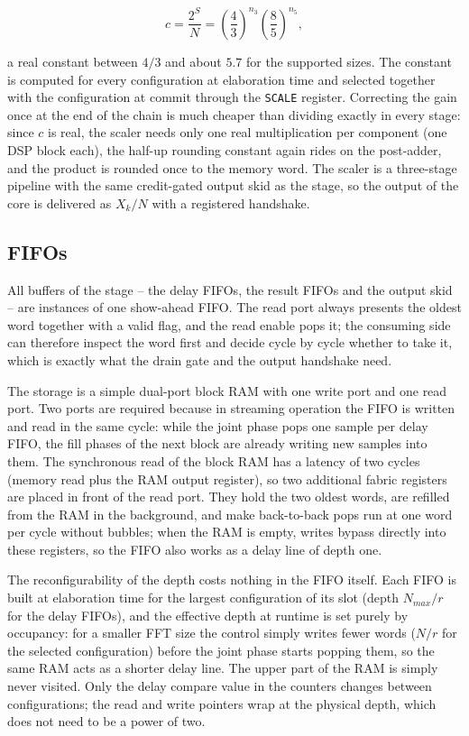 \documentclass[a4paper,12pt, master]{etf}
\begin{document}
\begin{equation}
    c = \frac{2^{S}}{N} = \left(\frac{4}{3}\right)^{n_3} \left(\frac{8}{5}\right)^{n_5},
\end{equation}

a real constant between $4/3$ and about $5.7$ for the supported sizes. The constant is computed for every configuration at elaboration time and selected together with the configuration at commit through the \texttt{SCALE} register. Correcting the gain once at the end of the chain is much cheaper than dividing exactly in every stage: since $c$ is real, the scaler needs only one real multiplication per component (one DSP block each), the half-up rounding constant again rides on the post-adder, and the product is rounded once to the memory word. The scaler is a three-stage pipeline with the same credit-gated output skid as the stage, so the output of the core is delivered as $X_k / N$ with a registered handshake.

\subsection{FIFOs}

All buffers of the stage -- the delay FIFOs, the result FIFOs and the output skid -- are instances of one show-ahead FIFO. The read port always presents the oldest word together with a valid flag, and the read enable pops it; the consuming side can therefore inspect the word first and decide cycle by cycle whether to take it, which is exactly what the drain gate and the output handshake need.

The storage is a simple dual-port block RAM with one write port and one read port. Two ports are required because in streaming operation the FIFO is written and read in the same cycle: while the joint phase pops one sample per delay FIFO, the fill phases of the next block are already writing new samples into them. The synchronous read of the block RAM has a latency of two cycles (memory read plus the RAM output register), so two additional fabric registers are placed in front of the read port. They hold the two oldest words, are refilled from the RAM in the background, and make back-to-back pops run at one word per cycle without bubbles; when the RAM is empty, writes bypass directly into these registers, so the FIFO also works as a delay line of depth one.

The reconfigurability of the depth costs nothing in the FIFO itself. Each FIFO is built at elaboration time for the largest configuration of its slot (depth $N_{max}/r$ for the delay FIFOs), and the effective depth at runtime is set purely by occupancy: for a smaller FFT size the control simply writes fewer words ($N/r$ for the selected configuration) before the joint phase starts popping them, so the same RAM acts as a shorter delay line. The upper part of the RAM is simply never visited. Only the delay compare value in the counters changes between configurations; the read and write pointers wrap at the physical depth, which does not need to be a power of two.
\end{document}
